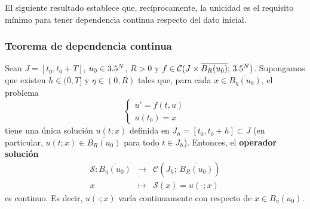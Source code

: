 El siguiente resultado establece que, recíprocamente, la unicidad es el requisito mínimo para tener dependencia continua respecto del dato inicial.

\subsubsection{Teorema de dependencia continua}

\begin{teorema}
    Sean $J = [t_0, t_0 + T]$, $u_0 \in 3.5^N$, $R > 0$ y $f \in \mathcal{C}(J \times \overline{B_R(u_0)}; \, 3.5^N)$. Supongamos que existen $h \in (0, T]$ y $\eta \in (0, R)$ tales que, para cada $x \in \overline{B_\eta(u_0)}$, el problema
    \[
        \begin{cases}
            u' = f(t, u) \\
            u(t_0) = x
        \end{cases}
    \]
    tiene una única solución $u(t; x)$ definida en $J_h = [t_0, t_0 + h] \subset J$ (en particular, $u(t; x) \in \overline{B_R(u_0)}$ para todo $t \in J_h$). Entonces, el \textbf{operador solución}
    \[
        \begin{array}{rcl}
            \mathcal{S} : \overline{B_\eta(u_0)} & \longrightarrow & \mathcal{C}(J_h; \, \overline{B_R(u_0)}) \\
            x & \longmapsto & \mathcal{S}(x) = u(\cdot; x)
        \end{array}
    \]
    es continuo. Es decir, $u(\cdot; x)$ varía continuamente con respecto de $x \in \overline{B_\eta(u_0)}$.
\end{teorema}

